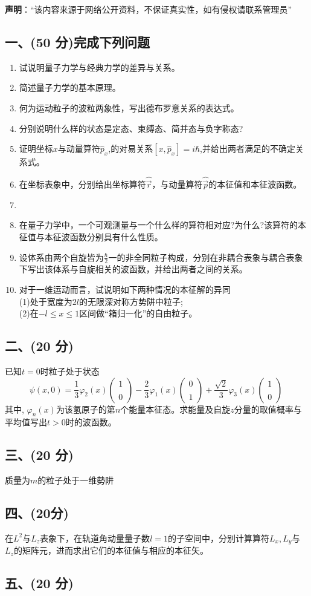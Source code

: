 
\textbf{声明}：“该内容来源于网络公开资料，不保证真实性，如有侵权请联系管理员”

\subsection{一、(50 分)完成下列问题}
\begin{enumerate}
\item 试说明量子力学与经典力学的差异与关系。
\item 简述量子力学的基本原理。
\item 何为运动粒子的波粒两象性，写出德布罗意关系的表达式。
\item 分别说明什么样的状态是定态、束缚态、简并态与负字称态?
\item 证明坐标$x$与动量算符$\hat{p}_x$,的对易关系$[x,\hat{p}_x]=i\hbar$,并给出两者满足的不确定关系式。
\item 在坐标表象中，分别给出坐标算符$\hat{\vec{r}}$，与动量算符$\hat{\vec{p}}$的本征值和本征波函数。
\item 
\item 在量子力学中，一个可观测量与一个什么样的算符相对应?为什么?该算符的本征值与本征波函数分别具有什么性质。
\item 设体系由两个自旋皆为$\frac{\hbar}{2}$一的非全同粒子构成，分别在非耦合表象与耦合表象下写出该体系与自旋相关的波函数，并给出两者之间的关系。
\item 对于一维运动而言，试说明如下两种情况的本征解的异同\\
(1)处于宽度为$2l$的无限深对称方势阱中粒子;\\
(2)在$-l\leq x \leq1$区间做“箱归一化”的自由粒子。
\end{enumerate}
\subsection{二、(20 分)}
已知$t=0$时粒子处于状态
$$\psi(x,0) = \frac{1}{3} \varphi_2(x) 
\begin{pmatrix}
1 \\\\
0
\end{pmatrix}
-\frac{2}{3} \varphi_1(x) 
\begin{pmatrix}
0 \\\\
1
\end{pmatrix}
+ \frac{\sqrt{2}}{3} \varphi_3(x)
\begin{pmatrix}
1 \\\\
0
\end{pmatrix}~$$
其中, $\varphi_n(x)$为该氢原子的第$n$个能量本征态。求能量及自旋$z$分量的取值概率与平均值写出$t>0$时的波函数。
\subsection{三、(20 分) }
质量为$m$的粒子处于一维勢阱
\subsection{四、(20分) }
在$L^2$与$L_z$表象下，在轨道角动量量子数$l=1$的子空间中，分别计算算符$L_x,L_y$与$L_z$的矩阵元，进而求出它们的本征值与相应的本征矢。
\subsection{五、(20 分)}